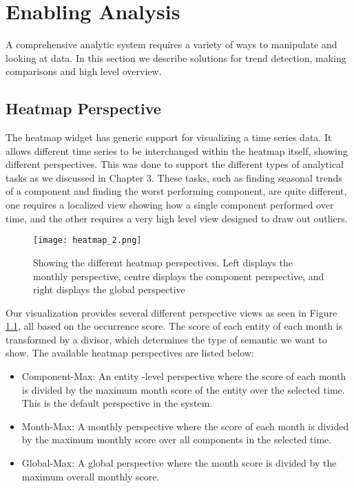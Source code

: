 %
\chapter{Enabling Analysis}
A comprehensive analytic system requires a variety of ways to manipulate and
looking at data. In this section we describe solutions for trend detection,
making comparisons and high level overview.
 

\section{Heatmap Perspective}
The heatmap widget has generic support for visualizing a time series data. It 
allows different time series to be interchanged within the heatmap itself, showing 
different perspectives. This was done to support the different types of
analytical tasks as we discussed in Chapter 3. These tasks, such as
finding seasonal trends of a component and finding the worst performing
component, are quite different, one requires a localized view showing how a
single component performed over time, and the other requires a very high level
view designed to draw out outliers.

	\begin{figure} 
	 \centering  
	 \texttt{[image: heatmap\_2.png]}
	 \caption[Heatmap Perspectives]{Showing the different heatmap perspectives. Left
	 displays the monthly perspective, centre displays the component perspective, and right displays the
	 global perspective}
	 \label{figure:heatmap}
	\end{figure}


Our visualization provides several different perspective views as seen in
Figure \ref{figure:heatmap}, all based on the occurrence score. The score of
each entity of each month is transformed by a divisor, which determines the
type of semantic we want to show. The available heatmap perspectives are listed below:

\begin{itemize} [noitemsep]
  \item Component-Max: An entity -level perspective where the score of
  each month is divided by the maximum month score of the entity over the
  selected time. This is the default perspective in the system.
  
  \item Month-Max: A monthly perspective where the score of each month is 
  divided by the maximum monthly score over all components in the selected time.
  
  \item Global-Max: A global perspective where the month score is divided by the
  maximum overall monthly score.
\end{itemize}
 
